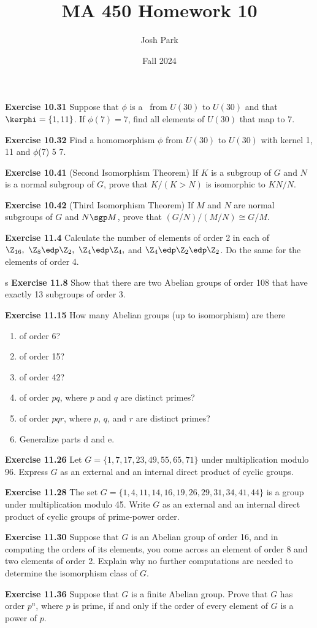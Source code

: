 \documentclass{article}
\author{Josh Park}
\date{\vspace*{-1em}Fall 2024}
\title{\vspace*{-2em}MA 450 Homework 10\vspace*{-1em}}
\begin{document}
\maketitle
\textbf{Exercise 10.31} Suppose that \(\phi\) is a \homo\ from \(U(30)\) to \(U(30)\) and that \(\kerphi = \{1,11\}\). If \(\phi(7) = 7\), find all elements of \(U(30)\) that map to 7.


\textbf{Exercise 10.32} Find a homomorphism \(\phi\) from $U(30)$ to $U(30)$ with kernel {1, 11} and $\phi$(7) 5 7.


\textbf{Exercise 10.41} (Second Isomorphism Theorem) If $K$ is a subgroup of $G$ and $N$ is a normal subgroup of $G$, prove that $K/(K > N)$ is isomorphic to $KN/N$.


\textbf{Exercise 10.42} (Third Isomorphism Theorem) If $M$ and $N$ are normal subgroups of $G$ and $N \sgp M$, prove that $(G/N)/(M/N) \cong G/M$.


\textbf{Exercise 11.4} Calculate the number of elements of order 2 in each of $\Z_{16},\ \Z_{8} \edp \Z_{2},\ \Z_{4} \edp \Z_{4},$ and $\Z_{4} \edp \Z_{2} \edp \Z_{2}$. Do the same for the elements of order 4.

s
\textbf{Exercise 11.8} Show that there are two Abelian groups of order 108 that have exactly 13 subgroups of order 3.


\textbf{Exercise 11.15} How many Abelian groups (up to isomorphism) are there
\begin{enumerate}[label=\textbf{\alph*.}]
  \item of order 6?
  \item of order 15?
  \item of order 42?
  \item of order \(pq\), where \(p\) and \(q\) are distinct primes?
  \item of order $pqr$, where $p$, $q$, and $r$ are distinct primes?
  \item Generalize parts d and e.
\end{enumerate}


\textbf{Exercise 11.26} Let $G = \{1, 7, 17, 23, 49, 55, 65, 71\}$ under multiplication modulo 96. Express $G$ as an external and an internal direct product of cyclic groups.


\textbf{Exercise 11.28} The set $G = \{1, 4, 11, 14, 16, 19, 26, 29, 31, 34, 41, 44\}$ is a group under multiplication modulo 45. Write $G$ as an external and an internal direct product of cyclic groups of prime-power order.


\textbf{Exercise 11.30} Suppose that $G$ is an Abelian group of order 16, and in computing the orders of its elements, you come across an element of order 8 and two elements of order 2. Explain why no further computations are needed to determine the isomorphism class of $G$.


\textbf{Exercise 11.36} Suppose that $G$ is a finite Abelian group. Prove that $G$ has order $p^n$, where $p$ is prime, if and only if the order of every element of $G$ is a power of $p$.
\end{document}
